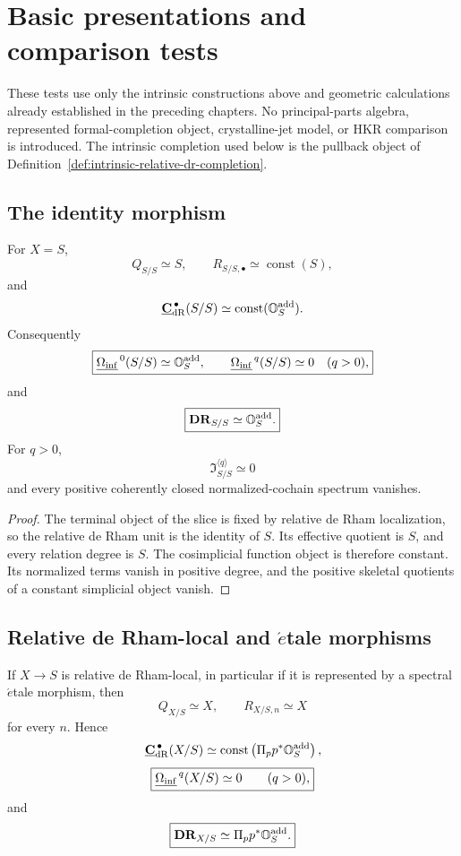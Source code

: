 \section{Basic presentations and comparison tests}
\label{sec:monadic-de-rham-basic-tests}

These tests use only the intrinsic constructions above and geometric calculations already established
in the preceding chapters.  No principal-parts algebra, represented formal-completion object, crystalline-jet model, or
HKR comparison is introduced.  The intrinsic completion used below is the pullback object of
Definition~\ref{def:intrinsic-relative-dr-completion}.

\subsection{The identity morphism}

\begin{proposition}
\label{prop:monadic-de-rham-terminal-case}
For \(X=S\),
\[
    Q_{S/S}\simeq S,
    \qquad
    R_{S/S,\bullet}\simeq\operatorname{const}(S),
\]
and
\[
    \underline{\mathbf C}_{\mathrm{dR}}^{\,\bullet}(S/S)
    \simeq
    \operatorname{const}(\mathbb O_S^{\mathrm{add}}).
\]
Consequently
\[
\boxed{
    \underline{\Omega_{\mathrm{inf}}}^{\,0}(S/S)
    \simeq
    \mathbb O_S^{\mathrm{add}},
    \qquad
    \underline{\Omega_{\mathrm{inf}}}^{\,q}(S/S)\simeq0
    \quad(q>0),
}
\]
and
\[
\boxed{
    \mathbf{DR}_{S/S}
    \simeq
    \mathbb O_S^{\mathrm{add}}.
}
\]
For \(q>0\),
\[
    \mathfrak I^{\langle q\rangle}_{S/S}\simeq0
\]
and every positive coherently closed normalized-cochain spectrum vanishes.
\end{proposition}

\begin{proof}
The terminal object of the slice is fixed by relative de Rham localization, so the relative de Rham
unit is the identity of \(S\).  Its effective quotient is \(S\), and every relation degree is \(S\).
The cosimplicial function object is therefore constant.  Its normalized terms vanish in positive
degree, and the positive skeletal quotients of a constant simplicial object vanish.
\end{proof}

\subsection{Relative de Rham-local and \texorpdfstring{\(\acute{e}\)tale}{etale} morphisms}

\begin{proposition}
\label{prop:monadic-de-rham-etale-case}
If \(X\to S\) is relative de Rham-local, in particular if it is represented by a spectral
\(\acute{e}\)tale morphism, then
\[
    Q_{X/S}\simeq X,
    \qquad
    R_{X/S,n}\simeq X
\]
for every \(n\).  Hence
\[
    \underline{\mathbf C}_{\mathrm{dR}}^{\,\bullet}(X/S)
    \simeq
    \operatorname{const}
    \left(
        \Pi_p p^*\mathbb O_S^{\mathrm{add}}
    \right),
\]
\[
\boxed{
    \underline{\Omega_{\mathrm{inf}}}^{\,q}(X/S)\simeq0
    \qquad(q>0),
}
\]
and
\[
\boxed{
    \mathbf{DR}_{X/S}
    \simeq
    \Pi_p p^*\mathbb O_S^{\mathrm{add}}.
}
\]
\end{proposition}

